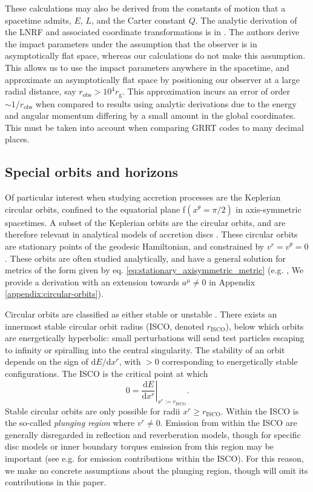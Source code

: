 \documentclass[fleqn,usenatbib]{mnras}
\renewcommand{\d}{\text{d}}
\newcommand{\rg}{r_\text{g}}
\newcommand{\risco}{r_\text{ISCO}}
\begin{document}
These calculations may also be derived from the constants of motion that a
spacetime admits, $E$, $L$, and the Carter constant $Q$. The analytic
derivation of the LNRF and associated coordinate transformations is in
\cite{cunningham_optical_1973}. The authors derive the impact parameters under
the assumption that the observer is in asymptotically flat space, whereas our
calculations do not make this assumption. This allows us to use the impact
parameters anywhere in the spacetime, and approximate an asymptotically flat
space by positioning our observer at a large radial distance, say $r_\text{obs}
> 10^4 \rg$. This approximation incurs an error of order $\sim1/r_\text{obs}$
when compared to results using analytic derivations due to the energy and
angular momentum differing by a small amount in the global coordinates. This
must be taken into account when comparing GRRT codes to many decimal places.

\subsection{Special orbits and horizons}
\label{sec:special-orbits}

Of particular interest when studying accretion processes are the Keplerian
circular orbits, confined to the equatorial plane f$(x^\theta = \pi/2)$ in
axis-symmetric spacetimes. A subset of the Keplerian orbits are the circular
orbits, and are therefore relevant in analytical models of accretion discs
\citep{shakura_black_1973}. These circular orbits are stationary points of the
geodesic Hamiltonian, and constrained by $v^r = v^\theta = 0$.  These orbits are
often studied analytically, and have a general solution for metrics of the form
given by eq. \eqref{eq:stationary_axisymmetric_metric} (e.g.
\citealp{johannsen_regular_2013}, We provide a derivation with an extension
towards $a^\mu \neq 0$ in Appendix \ref{appendix:circular-orbits}).

Circular orbits are classified as either stable or unstable
\citep{wilkins_bound_1972,bardeen_rotating_1972}. There exists an innermost
stable circular orbit radius (ISCO, denoted $\risco$), below which orbits
are energetically hyperbolic: small perturbations will send test particles
escaping to infinity or spiralling into the central singularity. The stability of
an orbit depends on the sign of $\d E / \d x^r$, with $>0$ corresponding to
energetically stable configurations. The ISCO is the critical point at
which
\begin{equation}
    \label{eq:isco-definition}
    0 = \left. \frac{\d E}{\d x^r} \right\rvert_{x^r := \risco}.
\end{equation}
Stable circular orbits are only possible for radii $x^r \geq \risco$.  Within
the ISCO is the so-called \textit{plunging region} where $v^r \neq 0$.  Emission
from within the ISCO are generally disregarded in reflection and reverberation
models, though for specific disc models or inner boundary torques emission from
this region may be important (see e.g.
\citealp{reynolds_isco_1997,young_isco_1998, mummery_continuum_2024} for
emission contributions within the ISCO). For this reason, we make no concrete
assumptions about the plunging region, though will omit its contributions in
this paper.
\end{document}
